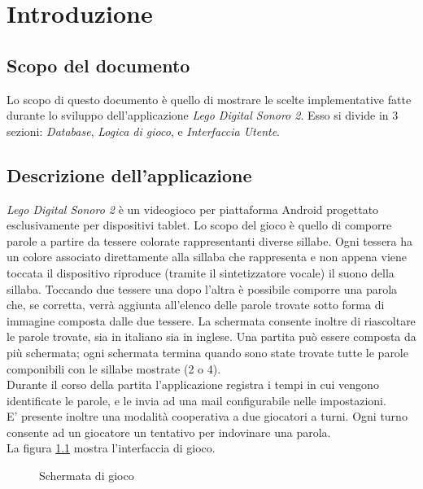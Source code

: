 


\chapter{Introduzione}


\section{Scopo del documento}
Lo scopo di questo documento è quello di mostrare le scelte implementative fatte durante lo sviluppo dell'applicazione \textit{Lego Digital Sonoro 2}. Esso si divide in $3$ sezioni: \textit{Database}, \textit{Logica di gioco}, e \textit{Interfaccia Utente}.

\section{Descrizione dell'applicazione}
\textit{Lego Digital Sonoro 2} è un videogioco per piattaforma Android progettato esclusivamente per dispositivi tablet. Lo scopo del gioco è quello di comporre parole a partire da tessere colorate rappresentanti diverse sillabe. Ogni tessera ha un colore associato direttamente alla sillaba che rappresenta e non appena viene toccata il dispositivo riproduce (tramite il sintetizzatore vocale) il suono della sillaba. Toccando due tessere una dopo l'altra è possibile comporre una parola che, se corretta, verrà aggiunta all'elenco delle parole trovate sotto forma di immagine composta dalle due tessere. La schermata consente inoltre di riascoltare le parole trovate, sia in italiano sia in inglese. Una partita può essere composta da più schermata; ogni schermata termina quando sono state trovate tutte le parole componibili con le sillabe mostrate (2 o 4).\\
Durante il corso della partita l'applicazione registra i tempi in cui vengono identificate le parole, e le invia ad una mail configurabile nelle impostazioni.\\
E' presente inoltre una modalità cooperativa a due giocatori a turni. Ogni turno consente ad un giocatore un tentativo per indovinare una parola.\\
La figura \ref{fig:play_ui} mostra l'interfaccia di gioco.

\begin{figure}[h!]
\label{fig:play_ui}
  \centering
  \caption{Schermata di gioco}
\end{figure}